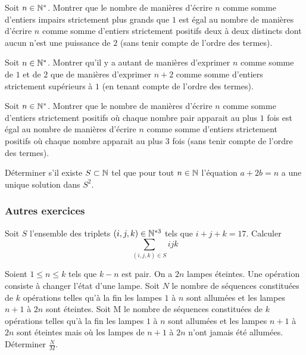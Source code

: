 \begin{exo}
Soit $n\in\mathbb N^*$. Montrer que le nombre de manières d'écrire $n$ comme somme d'entiers impairs strictement plus grands que $1$ est égal au nombre de manières d'écrire $n$ comme somme d'entiers strictement positifs deux à deux distincts dont aucun n'est une puissance de $2$ (sans tenir compte de l'ordre des termes).
\end{exo}

\begin{exo}
Soit $n\in\mathbb N^*$. Montrer qu'il y a autant de manières d'exprimer $n$ comme somme de $1$ et de $2$ que de manières d'exprimer $n+2$ comme somme d'entiers strictement supérieurs à $1$ (en tenant compte de l'ordre des termes).
\end{exo}

\begin{exo}
Soit $n\in\mathbb N^*$. Montrer que le nombre de manières d'écrire $n$ comme somme d'entiers strictement positifs où chaque nombre pair apparait au plus $1$ fois est égal au nombre de manières d'écrire $n$ comme somme d'entiers strictement positifs où chaque nombre apparait au plus $3$ fois (sans tenir compte de l'ordre des termes).
\end{exo}

\begin{exo}
Déterminer s'il existe $S\subset\mathbb N$ tel que pour tout $n\in\mathbb N$ l'équation $a+2b=n$ a une unique solution dans $S^2$.
\end{exo}

\subsubsection*{Autres exercices}

\begin{exo}
Soit $S$ l'ensemble des triplets $(i,j,k)\in\mathbb N^{\ast 3}$ tels que $i+j+k=17$. Calculer \[\sum_{(i,j,k)\in S}ijk\]
\end{exo}

\begin{exo}
Soient $1 \leq n \leq k$ tels que $k-n$ est pair. On a $2n$ lampes éteintes. Une opération consiste à changer l'état d'une lampe. Soit $N$ le nombre de séquences constituées de $k$ opérations telles qu'à la fin les lampes $1$ à $n$ sont allumées et les lampes  $n+1$ à $2n$ sont éteintes. Soit M le nombre de séquences constituées de $k$ opérations telles qu'à la fin les lampes $1$ à $n$ sont allumées et les lampes  $n+1$ à $2n$ sont éteintes mais où les lampes de $n+1$ à $2n$
n'ont jamais été allumées. Déterminer $\frac{N}{M}$.
\end{exo}

